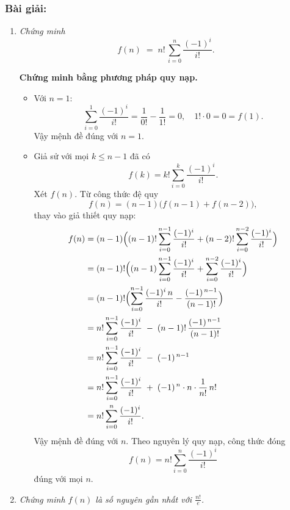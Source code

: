 \documentclass[a4paper,12pt]{article}
\begin{document}
\subsubsection*{Bài giải:}
\begin{enumerate}[label=(\alph*)]
  \item \emph{Chứng minh}
  \[
    f(n)
    \;=\;
    n!\,\sum_{i=0}^{n}\frac{(-1)^i}{i!}.
  \]

  \textbf{Chứng minh bằng phương pháp quy nạp.}

  \begin{itemize}
    \item Với \(n=1\):
    \[
      \sum_{i=0}^{1}\frac{(-1)^i}{i!}
      = \frac{1}{0!} - \frac{1}{1!} = 0,
      \quad
      1!\cdot0 = 0 = f(1).
    \]
    Vậy mệnh đề đúng với \(n=1\).

    \item Giả sử với mọi \(k\le n-1\) đã có
    \[
      f(k)=k!\sum_{i=0}^{k}\frac{(-1)^i}{i!}.
    \]
    Xét \(f(n)\). Từ công thức đệ quy
    \[
      f(n)
      = (n-1)\bigl(f(n-1)+f(n-2)\bigr),
    \]
    thay vào giả thiết quy nạp:
    \begin{align*}
      f(n)
      &= (n-1)\Bigl((n-1)!\sum_{i=0}^{n-1}\frac{(-1)^i}{i!}
             +(n-2)!\sum_{i=0}^{n-2}\frac{(-1)^i}{i!}\Bigr)\\
      &= (n-1)!\Bigl((n-1)\sum_{i=0}^{n-1}\frac{(-1)^i}{i!}
             +\sum_{i=0}^{n-2}\frac{(-1)^i}{i!}\Bigr)\\
      &= (n-1)!\Bigl(\sum_{i=0}^{n-1}\frac{(-1)^i\,n}{i!}
             -\frac{(-1)^{\,n-1}}{(n-1)!}\Bigr)\\
      &= n!\sum_{i=0}^{n-1}\frac{(-1)^i}{i!}
         \;-\;(n-1)!\,\frac{(-1)^{\,n-1}}{(n-1)!}\\
      &= n!\sum_{i=0}^{n-1}\frac{(-1)^i}{i!}
         \;-\;(-1)^{\,n-1}\\
      &= n!\sum_{i=0}^{n-1}\frac{(-1)^i}{i!}
         \;+\;(-1)^{\,n}\cdot n\cdot\frac{1}{n!}\,n!\\
      &= n!\sum_{i=0}^{n}\frac{(-1)^i}{i!}.
    \end{align*}
    Vậy mệnh đề đúng với \(n\). Theo nguyên lý quy nạp, công thức đóng
    \[
      f(n)=n!\sum_{i=0}^{n}\frac{(-1)^i}{i!}
    \]
    đúng với mọi \(n\).
  \end{itemize}

  \medskip

  \item \emph{Chứng minh \(f(n)\) là số nguyên gần nhất với \(\tfrac{n!}{e}\).}


\end{enumerate}
\end{document}
